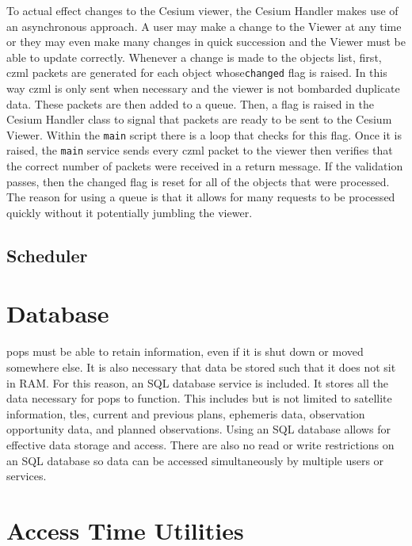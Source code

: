 To actual effect changes to the Cesium viewer, the Cesium Handler makes use of
an asynchronous approach. A user may make a change to the Viewer at any time or
they may even make many changes in quick succession and the Viewer must be able
to update correctly. Whenever a change is made to the objects list, first,
\gls{czml} packets are generated for each object whose\texttt{changed} flag is
raised. In this way czml is only sent when necessary and the viewer is not
bombarded duplicate data. These packets are then added to a queue. Then, a flag
is raised in the Cesium Handler class to signal that packets are ready to be
sent to the Cesium Viewer. Within the \texttt{main} script there is a loop that
checks for this flag. Once it is raised, the \texttt{main} service sends every
\gls{czml} packet to the viewer then verifies that the correct number of
packets were received in a return message. If the validation passes, then the
changed flag is reset for all of the objects that were processed. The reason
for using a queue is that it allows for many requests to be processed quickly
without it potentially jumbling the viewer.


\subsection{Scheduler}




\section{Database}

\gls{pops} must be able to retain information, even if it is
shut down or moved somewhere else. It is also necessary that data be stored
such that it does not sit in RAM. For this reason, an SQL database service is
included. It stores all the data necessary for \gls{pops} to function. This
includes but is not limited to satellite information, \gls{tle}s, current and
previous plans, ephemeris data, observation opportunity data, and planned
observations. Using an SQL database allows for effective data storage and
access. There are also no read or write restrictions on an SQL database so data
can be accessed simultaneously by multiple users or services.





\section{Access Time Utilities}


